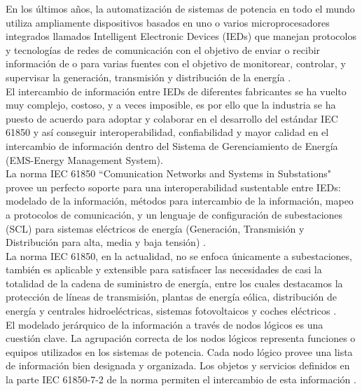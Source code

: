 \documentclass[conference,twocolumn]{IEEEtran}
\begin{document}
En los \'ultimos a\~nos, la automatizaci\'on de sistemas de potencia en todo el mundo utiliza ampliamente dispositivos basados en uno o varios microprocesadores \cite{Santoso2000, Schwarz2000} integrados llamados Intelligent Electronic Devices (IEDs)  que manejan protocolos y tecnolog\'ias de redes de comunicaci\'on con el objetivo de enviar o recibir informaci\'on de o para varias fuentes con el objetivo de monitorear, controlar, y supervisar la generaci\'on, transmisi\'on y distribuci\'on de la energ\'ia \cite{McDonald2007, IEEE1997, Schwarz2008}.\\

El intercambio de informaci\'on entre IEDs de diferentes fabricantes se ha vuelto muy complejo, costoso, y a veces imposible, es por ello que la industria se ha puesto de acuerdo para adoptar y colaborar en el desarrollo del est\'andar IEC 61850 y as\'i conseguir interoperabilidad, confiabilidad y mayor calidad en el intercambio de informaci\'on dentro del Sistema de Gerenciamiento de Energ\'ia (EMS-Energy Management System). \\

La norma IEC 61850 ``Comunication Networks and Systems in Substations" provee un perfecto soporte para una interoperabilidad sustentable entre IEDs: modelado de la informaci\'on, m\'etodos para intercambio de la informaci\'on, mapeo a protocolos de comunicaci\'on, y un lenguaje de configuraci\'on de subestaciones (SCL) para sistemas el\'ectricos de energ\'ia (Generaci\'on, Transmisi\'on y Distribuci\'on para alta, media y baja tensi\'on) \cite{Schwarz2008}. \\

La norma IEC 61850, en la actualidad, no se enfoca \'unicamente a subestaciones, tambi\'en es aplicable y extensible para satisfacer las necesidades de casi la totalidad de la cadena de suministro de energ\'ia, entre los cuales destacamos la protecci\'on de l\'ineas de transmisi\'on, plantas de energ\'ia e\'olica, distribuci\'on de energ\'ia y centrales hidroel\'ectricas, sistemas fotovoltaicos y coches el\'ectricos \cite{Schwarz2005, DER2009, German2009}. \\

El modelado jer\'arquico de la informaci\'on a trav\'es de nodos l\'ogicos es una cuesti\'on clave. La agrupaci\'on correcta de los nodos l\'ogicos representa funciones o equipos utilizados en los sistemas de potencia. Cada nodo l\'ogico provee una lista de informaci\'on bien designada y organizada. Los objetos y servicios definidos en la parte IEC 61850-7-2 de la norma permiten el intercambio de esta informaci\'on \cite{TC572004}.\\
\end{document}
